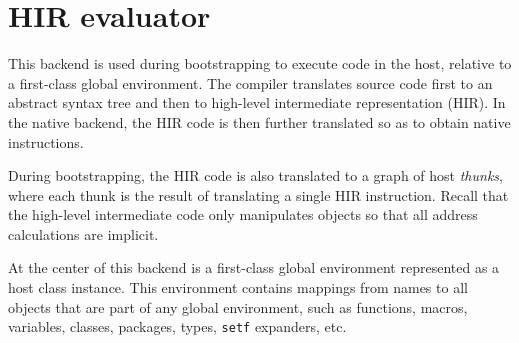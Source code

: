 \chapter{HIR evaluator}

This backend is used during bootstrapping to execute \sysname{} code
in the host, relative to a \sysname{} first-class global environment.
The compiler translates source code first to an abstract syntax tree
and then to high-level intermediate representation (HIR).  In the
native backend, the HIR code is then further translated so as to
obtain native instructions.

During bootstrapping, the HIR code is also translated to a graph of
host \emph{thunks}, where each thunk is the result of translating a
single HIR instruction.  Recall that the high-level intermediate code
only manipulates \commonlisp{} objects so that all address
calculations are implicit.

At the center of this backend is a \sysname{} first-class global
environment represented as a host class instance.  This environment
contains mappings from names to all objects that are part of any
global environment, such as functions, macros, variables, classes,
packages, types, \texttt{setf} expanders, etc.
